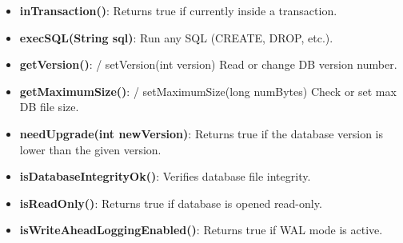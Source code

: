 \documentclass{report}
\begin{document}
\begin{itemize}
\begin{itemize}
                \item \textbf{inTransaction()}:	Returns true if currently inside a transaction.
                \item \textbf{execSQL(String sql)}:	Run any SQL (CREATE, DROP, etc.).
                \item \textbf{getVersion()}: / setVersion(int version)	Read or change DB version number.
                \item \textbf{getMaximumSize()}: / setMaximumSize(long numBytes)	Check or set max DB file size.
                \item \textbf{needUpgrade(int newVersion)}:	Returns true if the database version is lower than the given version.
                \item \textbf{isDatabaseIntegrityOk()}:	Verifies database file integrity.
                \item \textbf{isReadOnly()}:	Returns true if database is opened read-only.
                \item \textbf{isWriteAheadLoggingEnabled()}:	Returns true if WAL mode is active.
            \end{itemize}
    \end{itemize}

    \pagebreak 
\end{document}

